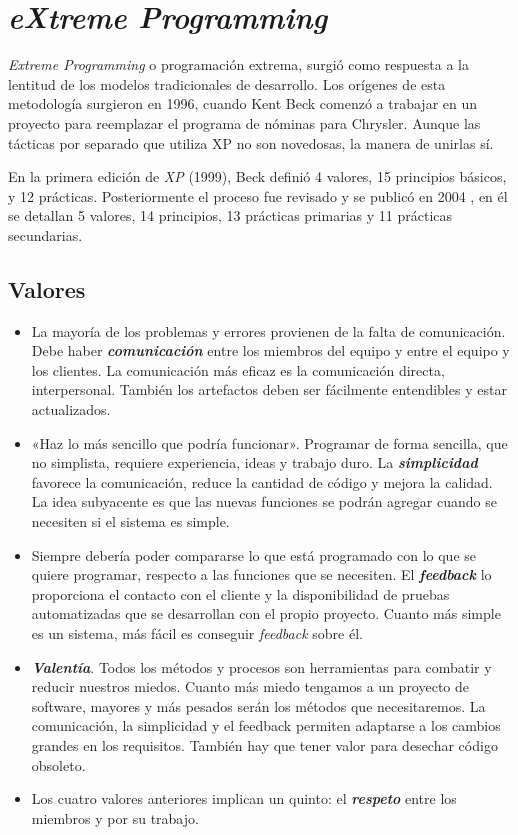 \section{\textit{eXtreme Programming}}
\textit{Extreme Programming}  o programación extrema, surgió como respuesta a la lentitud de los modelos tradicionales de desarrollo. Los orígenes de esta metodología surgieron en 1996, cuando Kent Beck comenzó a trabajar en un proyecto para reemplazar el programa de nóminas para Chrysler. Aunque las tácticas por separado que utiliza XP no son novedosas, la manera de unirlas sí. 

En la primera edición de \textit{XP} (1999), Beck definió 4 valores, 15 principios básicos, y 12 prácticas. Posteriormente el proceso fue revisado y se publicó en 2004 \cite{Beck:2004:EPE:1076267}, en él se detallan 5 valores, 14 principios, 13 prácticas primarias y 11 prácticas secundarias.

\subsection{Valores}
\begin{itemize}
\item La mayoría de los problemas y errores provienen de la falta de comunicación. Debe haber \textbf{\textit{comunicación}} entre los miembros del equipo y entre el equipo y los clientes. La comunicación más eficaz es la comunicación directa, interpersonal. También los artefactos deben ser fácilmente entendibles y estar actualizados.

\item «Haz lo más sencillo que podría funcionar». Programar de forma sencilla, que no simplista, requiere experiencia, ideas y trabajo duro. La \textbf{\textit{simplicidad}} favorece la comunicación, reduce la cantidad de código y mejora la calidad. La idea subyacente es que las nuevas funciones se podrán agregar cuando se necesiten si el sistema es simple.

\item Siempre debería poder compararse lo que está programado con lo que se quiere programar, respecto a las funciones que se necesiten. El \textbf{\textit{feedback}} lo proporciona el contacto con el cliente y la disponibilidad de pruebas automatizadas que se desarrollan con el propio proyecto. Cuanto más simple es un sistema, más fácil es conseguir \textit{feedback} sobre él. 

\item \textbf{\textit{Valentía}}. Todos los métodos y procesos son herramientas para combatir y reducir nuestros miedos. Cuanto más miedo tengamos a un proyecto de software, mayores y más pesados serán los métodos que necesitaremos. La comunicación, la simplicidad y el feedback permiten adaptarse a los cambios grandes en los requisitos. También hay que tener valor para desechar código obsoleto.

\item Los cuatro valores anteriores implican un quinto: el \textbf{\textit{respeto}} entre los miembros y por su trabajo.
\end{itemize}

